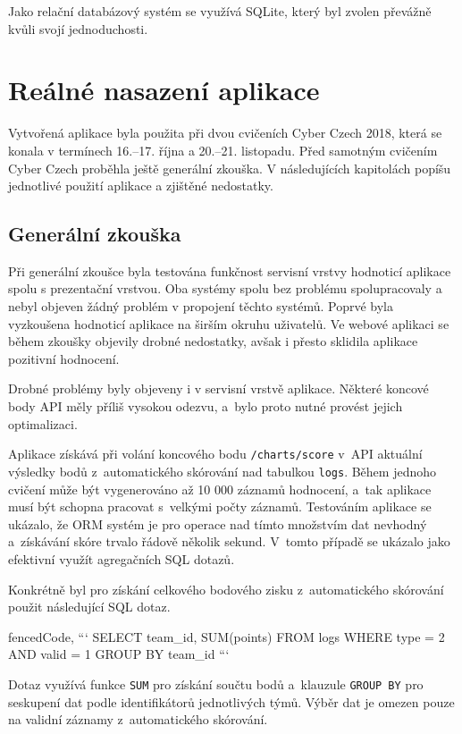 \documentclass[
  digital,
  twoside,
  table, 
  nolof, 
  nolot
]{fithesis3}
\begin{document}
Jako relační databázový systém se využívá SQLite, který byl zvolen převážně kvůli svojí jednoduchosti.

\section{Reálné nasazení aplikace}

Vytvořená aplikace byla použita při dvou cvičeních Cyber Czech 2018, která se konala v termínech 16.--17. října a 20.--21. listopadu. Před samotným cvičením Cyber Czech proběhla ještě generální zkouška. V následujících kapitolách popíšu jednotlivé použití aplikace a zjištěné nedostatky.

\subsection{Generální zkouška}
Při generální zkoušce byla testována funkčnost servisní vrstvy hodnoticí aplikace spolu s prezentační vrstvou. Oba systémy spolu bez problému spolupracovaly a nebyl objeven žádný problém v propojení těchto systémů. Poprvé byla vyzkoušena hodnoticí aplikace na širším okruhu uživatelů. Ve webové aplikaci se během zkoušky objevily drobné nedostatky, avšak i přesto sklidila aplikace pozitivní hodnocení.

Drobné problémy byly objeveny i v servisní vrstvě aplikace. Některé koncové body API měly příliš vysokou odezvu, a~bylo proto nutné provést jejich optimalizaci.

Aplikace získává při volání koncového bodu \texttt{/charts/score} v~API aktuální výsledky bodů z~automatického skórování nad tabulkou \texttt{logs}. Během jednoho cvičení může být vygenerováno až 10 000 záznamů hodnocení, a~tak aplikace musí být schopna pracovat s~velkými počty záznamů. Testováním aplikace se ukázalo, že ORM systém je pro operace nad tímto množstvím dat nevhodný a~získávání skóre trvalo řádově několik sekund. V~tomto případě se ukázalo jako efektivní využít agregačních SQL dotazů. 

Konkrétně byl pro získání celkového bodového zisku z~automatického skórování použit následující SQL dotaz.

\begin{markdown*}{%
  fencedCode,
}
```
SELECT team_id, SUM(points) FROM logs 
WHERE type = 2 AND valid = 1 
GROUP BY team_id
```
\end{markdown*}

Dotaz využívá funkce \texttt{SUM} pro získání součtu bodů a~klauzule \texttt{GROUP\ BY} pro seskupení dat podle identifikátorů jednotlivých týmů. Výběr dat je omezen pouze na validní záznamy z~automatického skórování.
\end{document}
